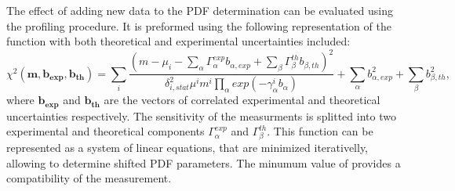 The effect of adding new data to the PDF determination can be evaluated using the profiling procedure\cite{PDFProf}. It is preformed using the following representation of the \chiD function with both theoretical and experimental uncertainties included:
\begin{equation}
\chi^{2}(\mathbf{m},\mathbf{b_{exp}}, \mathbf{b_{th}})=\sum_{i} \frac{(m-\mu_i-\sum_\alpha \Gamma_\alpha^{exp}b_{\alpha, exp}+\sum_\beta \Gamma_\beta^{th}b_{\beta, th})^2}{\delta^{2}_{i,stat}\mu^{i}m^{i}\prod_{\alpha}exp(-\gamma_{\alpha}^ib_{\alpha})}+\sum_{\alpha} b_{\alpha, exp}^2 + \sum_{\beta} b_{\beta, th}^2,
\end{equation}
where $\mathbf{b_{exp}}$ and $\mathbf{b_{th}}$ are the vectors of correlated experimental and theoretical uncertainties respectively. The sensitivity of the measurments is splitted into two experimental and theoretical components $\Gamma_\alpha^{exp}$ and $\Gamma_\beta^{th}$. This \chiD function can be represented as a system of linear equations, that are minimized iterativelly, allowing to determine shifted PDF parameters. The minumum value of \chiD provides a compatibility of the measurement.
